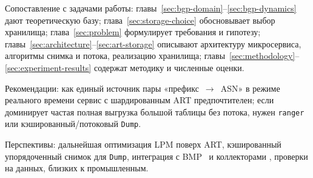 Сопоставление с задачами работы: главы~\ref{sec:bgp-domain}--\ref{sec:bgp-dynamics}
дают теоретическую базу; глава~\ref{sec:storage-choice} обосновывает
выбор хранилища; глава~\ref{sec:problem} формулирует требования и
гипотезу; главы~\ref{sec:architecture}--\ref{sec:art-storage} описывают
архитектуру микросервиса, алгоритмы снимка и потока, реализацию
хранилища; главы~\ref{sec:methodology}--\ref{sec:experiment-results}
содержат методику и численные оценки.

Рекомендации: как единый источник пары «префикс~$\rightarrow$~ASN» в
режиме реального времени сервис с шардированным ART предпочтителен; если
доминирует частая полная выгрузка большой таблицы без потока, нужен
\texttt{ranger} или кэшированный/потоковый \texttt{Dump}.

Перспективы: дальнейшая оптимизация LPM поверх ART, кэшированный
упорядоченный снимок для \texttt{Dump}, интеграция с
BMP~\cite{rfc7854} и коллекторами
\cite{ripe-ris,routeviews,ripe-beacons}, проверки на данных, близких к
промышленным.

